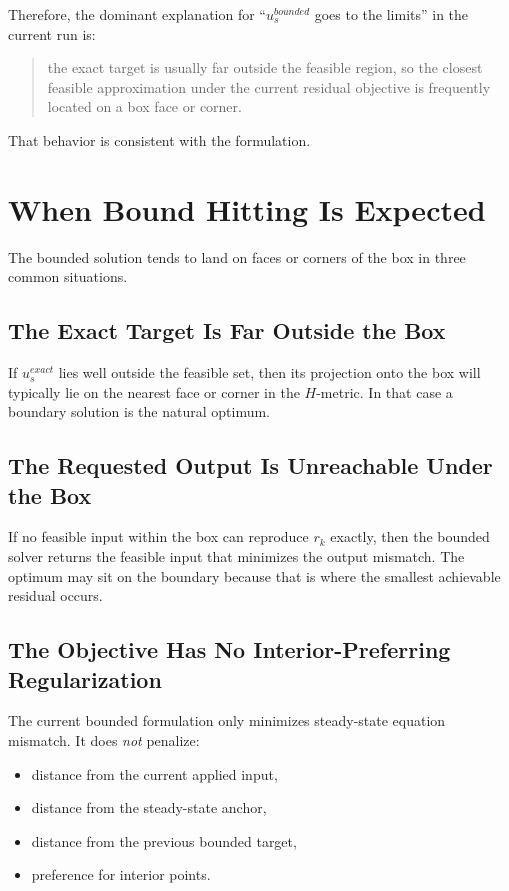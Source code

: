 \documentclass[11pt]{article}
\begin{document}
Therefore, the dominant explanation for ``$u_s^{bounded}$ goes to the limits'' in the current run is:
\begin{quote}
the exact target is usually far outside the feasible region, so the closest feasible approximation under the current residual objective is frequently located on a box face or corner.
\end{quote}

That behavior is consistent with the formulation.

\section{When Bound Hitting Is Expected}

The bounded solution tends to land on faces or corners of the box in three common situations.

\subsection{The Exact Target Is Far Outside the Box}

If $u_s^{exact}$ lies well outside the feasible set, then its projection onto the box will typically lie on the nearest face or corner in the $H$-metric. In that case a boundary solution is the natural optimum.

\subsection{The Requested Output Is Unreachable Under the Box}

If no feasible input within the box can reproduce $r_k$ exactly, then the bounded solver returns the feasible input that minimizes the output mismatch. The optimum may sit on the boundary because that is where the smallest achievable residual occurs.

\subsection{The Objective Has No Interior-Preferring Regularization}

The current bounded formulation only minimizes steady-state equation mismatch. It does \emph{not} penalize:
\begin{itemize}
\item distance from the current applied input,
\item distance from the steady-state anchor,
\item distance from the previous bounded target,
\item preference for interior points.
\end{itemize}
\end{document}
